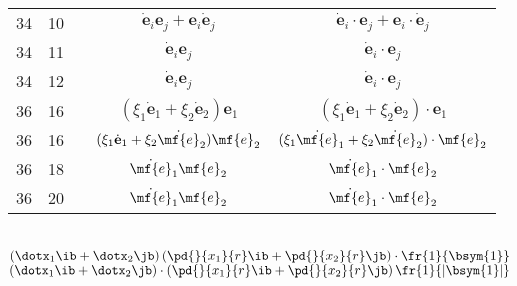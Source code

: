 \documentclass[a4paper,11pt]{article}
\begin{document}
\begin{center}
\begin{tabular}{|c|c|c|c|c|}
    34  & 10 & & $\dot{ \mathbf{ e } }_{ i } \mathbf{ e }_{ j }
                 + \mathbf{ e }_{ i } \dot{ \mathbf{ e } }_{ j }$
           & $\dot{ \mathbf{ e } }_{ i } \cdot \mathbf{ e }_{ j }
             + \mathbf{ e }_{ i } \cdot \dot{ \mathbf{ e } }_{ j }$ \\
    34  & 11 & & $\dot{ \mathbf{ e } }_{ i } \mathbf{ e }_{ j }$
           & $\dot{ \mathbf{ e } }_{ i } \cdot \mathbf{ e }_{ j }$ \\
    34  & 12 & & $\dot{ \mathbf{ e } }_{ i } \mathbf{ e }_{ j }$
           & $\dot{ \mathbf{ e } }_{ i } \cdot \mathbf{ e }_{ j }$ \\
    36  & 16 & & $( \xi_{ 1 } \dot{ \mathbf{ e } }_{ 1 } + \xi_{ 2 }
                 \dot{ \mathbf{ e } }_{ 2 }  ) \mathbf{ e }_{ 1 }$
           & $( \xi_{ 1 } \dot{ \mathbf{ e } }_{ 1 } + \xi_{ 2 }
             \dot{ \mathbf{ e } }_{ 2 }  ) \cdot \mathbf{ e }_{ 1 }$ \\
    36  & 16 & & $( \xi_{ 1 } \dot{ \mathbf{ e } }_{ 1 } + \xi_{ 2 }
                 \dot{ \mf{ e } }_{ 2 }  ) \mf{ e }_{ 2 }$
           & $( \xi_{ 1 } \dot{ \mf{ e } }_{ 1 } + \xi_{ 2 }
             \dot{ \mf{ e } }_{ 2 }  ) \cdot \mf{ e }_{ 2 }$ \\
    36  & 18 & & $\dot{ \mf{ e } }_{ 1 } \mf{ e }_{ 2 }$
           & $\dot{ \mf{ e } }_{ 1 } \cdot \mf{ e }_{ 2 }$ \\
    36  & 20 & & $\dot{ \mf{ e } }_{ 1 } \mf{ e }_{ 2 }$
           & $\dot{ \mf{ e } }_{ 1 } \cdot \mf{ e }_{ 2 }$ \\
    \hline
  \end{tabular}
\end{center}
\noi
{} \\
\Jest
$( \dotx_{ 1 } \ib + \dotx_{ 2 } \jb ) \left( \pd{}{ x_{ 1 } }{ r }
  \ib + \pd{}{ x_{ 2 } }{ r } \jb \right)
\cdot \fr{ 1 }{ \bsym{ 1 } }$ \\
\Powin
$( \dotx_{ 1 } \ib + \dotx_{ 2 } \jb ) \cdot \left( \pd{}{ x_{ 1 } }{
    r } \ib + \pd{}{ x_{ 2 } }{ r } \jb \right)
\fr{ 1 }{ | \bsym{ 1 } | }$ \\

\vspace{\spaceTwo}





 {}



\end{document}
